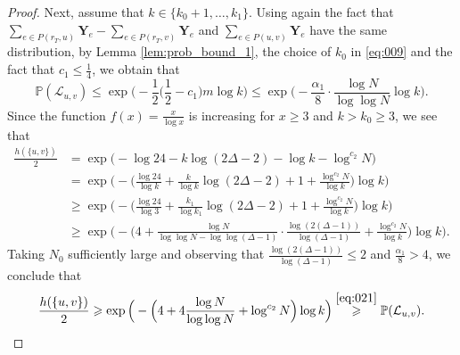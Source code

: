 \documentclass[11pt,leqno]{amsart}
\theoremstyle{remark}
\theoremstyle{plain}
\begin{document}
\begin{proof}
Next, assume that $k\in \{k_0+1,\dots,k_1\}$. Using again the fact that
$\sum_{e\in P(r_T,u)}\mathbf{Y}_e - \sum_{e\in P(r_T,v)}\mathbf{Y}_e$ and
$\sum_{e\in P(u,v)}\mathbf{Y}_e $ have the same distribution, by Lemma \ref{lem:prob_bound_1},
the choice of $k_0$ in \eqref{eq:009} and the fact that $c_1\leqslant\frac{1}{4}$, we obtain that
\begin{equation}\label{eq:021}
\mathbb{P}(\mathcal{L}_{u,v}) \leqslant \exp\Big(-\frac{1}{2} \Big(\frac{1}{2}-c_1\Big)m\log k \Big)
\leqslant \exp\Big( -\frac{\alpha_1}{8} \cdot \frac{\log N}{\log\log N} \log k \Big).
\end{equation}
Since the function $f(x) = \frac{x}{\log x}$ is increasing for $x\geqslant3$ and $k>k_0\geqslant3$, we see that
\begin{align*}
\frac{h(\{u,v\})}{2} & =
\exp\big(-\log 24-k\log(2\Delta-2)-\log k - \log^{c_2}N\big) \\
& =\exp\Big(-\Big(\frac{\log 24}{\log k}+\frac{k}{\log k }\log(2\Delta-2)+1+
\frac{\log^{c_2}N}{\log k}\Big)  \log k \Big)\\
& \geqslant \exp\Big(-\Big(\frac{\log 24}{\log 3 }+\frac{k_1}{\log k_1 }\log(2\Delta-2)+1+
\frac{\log^{c_2}N}{\log k }\Big)  \log k \Big)\\
& \geqslant \exp\Big(-\Big(4+\frac{\log N }{\log\log N-\log\log(\Delta-1)}\cdot\frac{\log (2(\Delta-1))}{\log(\Delta-1)}+
\frac{\log^{c_2}N}{\log k}\Big)  \log k \Big).
\end{align*}
Taking $N_0$ sufficiently large and observing that $\frac{\log(2(\Delta-1))}{\log(\Delta-1)}\leqslant2$
and $\frac{\alpha_1}{8}>4$, we conclude that
\begin{equation}\label{eq:022}
\frac{h(\{u,v\})}{2}
\geqslant\exp\Big(-\Big(4+4\frac{\log N}{\log\log N}+\log^{c_2}N\Big)\log k\Big)
\stackrel{\eqref{eq:021}}{\geqslant}\mathbb{P}(\mathcal{L}_{u,v}).
\end{equation}


\end{proof}
\end{document}
